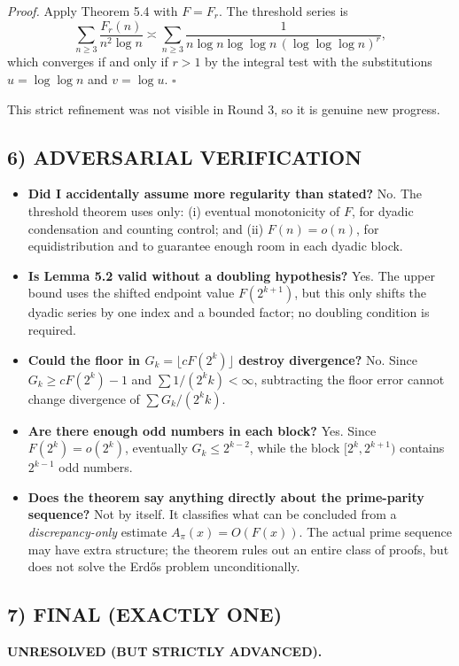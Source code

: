 \emph{Proof.}
Apply Theorem 5.4 with $F=F_r$.  The threshold series is
\[
\sum_{n\ge 3}\frac{F_r(n)}{n^2\log n}
\asymp
\sum_{n\ge 3}\frac{1}{n\log n\log\log n\,(\log\log\log n)^r},
\]
which converges if and only if $r>1$ by the integral test with the substitutions $u=\log\log n$ and $v=\log u$.
\hfill$\square$

This strict refinement was not visible in Round 3, so it is genuine new progress.

\subsection{6) ADVERSARIAL VERIFICATION}

\begin{itemize}
\item \textbf{Did I accidentally assume more regularity than stated?} No.  The threshold theorem uses only: (i) eventual monotonicity of $F$, for dyadic condensation and counting control; and (ii) $F(n)=o(n)$, for equidistribution and to guarantee enough room in each dyadic block.
\item \textbf{Is Lemma 5.2 valid without a doubling hypothesis?} Yes.  The upper bound uses the shifted endpoint value $F(2^{k+1})$, but this only shifts the dyadic series by one index and a bounded factor; no doubling condition is required.
\item \textbf{Could the floor in $G_k=\lfloor cF(2^k)\rfloor$ destroy divergence?} No.  Since $G_k\ge cF(2^k)-1$ and $\sum 1/(2^k k)<\infty$, subtracting the floor error cannot change divergence of $\sum G_k/(2^k k)$.
\item \textbf{Are there enough odd numbers in each block?} Yes.  Since $F(2^k)=o(2^k)$, eventually $G_k\le 2^{k-2}$, while the block $[2^k,2^{k+1})$ contains $2^{k-1}$ odd numbers.
\item \textbf{Does the theorem say anything directly about the prime-parity sequence?} Not by itself.  It classifies what can be concluded from a \emph{discrepancy-only} estimate $A_\pi(x)=O(F(x))$.  The actual prime sequence may have extra structure; the theorem rules out an entire class of proofs, but does not solve the Erd\H{o}s problem unconditionally.
\end{itemize}

\subsection{7) FINAL (EXACTLY ONE)}

\textbf{UNRESOLVED (BUT STRICTLY ADVANCED).}

